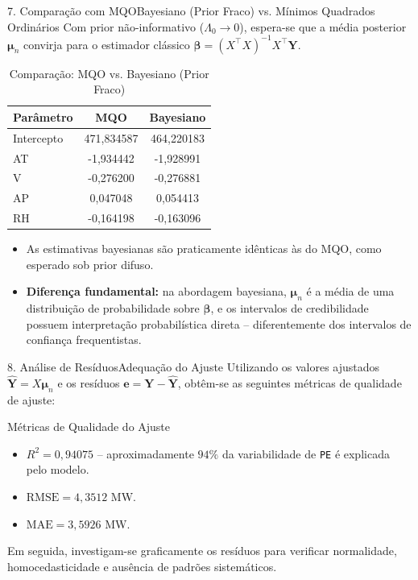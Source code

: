\documentclass[10pt,aspectratio=169]{beamer}
\begin{document}
\begin{frame}{7. Comparação com MQO}{Bayesiano (Prior Fraco) vs. Mínimos Quadrados Ordinários}
    Com prior não-informativo ($\Lambda_0 \to 0$), espera-se que a média posterior $\boldsymbol{\mu}_n$ convirja para o estimador clássico $\hat{\boldsymbol{\beta}} = (X^\top X)^{-1} X^\top \mathbf{Y}$.
    \begin{table}
        \centering
        \caption{Comparação: MQO vs. Bayesiano (Prior Fraco)}
        \small
        \begin{tabular}{lcc}
            \toprule
            \textbf{Parâmetro} & \textbf{MQO} & \textbf{Bayesiano} \\
            \midrule
            Intercepto & 471,834587 & 464,220183 \\
            AT         & -1,934442  & -1,928991  \\
            V          & -0,276200  & -0,276881  \\
            AP         & 0,047048   & 0,054413   \\
            RH         & -0,164198  & -0,163096  \\
            \bottomrule
        \end{tabular}
    \end{table}
    \begin{itemize}
        \item As estimativas bayesianas são praticamente idênticas às do MQO, como esperado sob prior difuso.
        \item \textbf{Diferença fundamental:} na abordagem bayesiana, $\boldsymbol{\mu}_n$ é a média de uma distribuição de probabilidade sobre $\boldsymbol{\beta}$, e os intervalos de credibilidade possuem interpretação probabilística direta -- diferentemente dos intervalos de confiança frequentistas.
    \end{itemize}
\end{frame}

\begin{frame}{8. Análise de Resíduos}{Adequação do Ajuste}
    Utilizando os valores ajustados $\hat{\mathbf{Y}} = X\boldsymbol{\mu}_n$ e os resíduos $\mathbf{e} = \mathbf{Y} - \hat{\mathbf{Y}}$, obtêm-se as seguintes métricas de qualidade de ajuste:
    \begin{block}{Métricas de Qualidade do Ajuste}
        \begin{itemize}
            \item $R^2 = 0,94075$ -- aproximadamente $94\%$ da variabilidade de \texttt{PE} é explicada pelo modelo.
            \item $\text{RMSE} = 4,3512$ MW.
            \item $\text{MAE} = 3,5926$ MW.
        \end{itemize}
    \end{block}
    \vspace{0.2cm}
    Em seguida, investigam-se graficamente os resíduos para verificar normalidade, homocedasticidade e ausência de padrões sistemáticos.
\end{frame}
\end{document}
